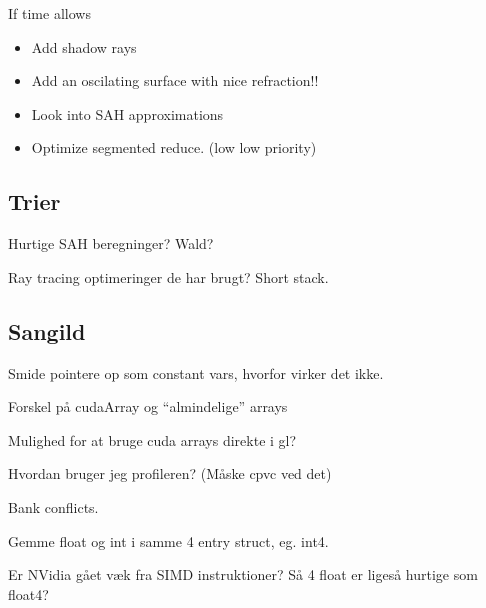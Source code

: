 If time allows

\begin{itemize}
\item Add shadow rays
\item Add an oscilating surface with nice refraction!!
\item Look into SAH approximations
\item Optimize segmented reduce. (low low priority)
\end{itemize}



\subsection*{Trier}

Hurtige SAH beregninger? Wald?

Ray tracing optimeringer de har brugt? Short stack.


\subsection*{Sangild}

Smide pointere op som constant vars, hvorfor virker det ikke.

Forskel på cudaArray og ``almindelige'' arrays

Mulighed for at bruge cuda arrays direkte i gl?

Hvordan bruger jeg profileren? (Måske cpvc ved det)

Bank conflicts.

Gemme float og int i samme 4 entry struct, eg. int4.

Er NVidia gået væk fra SIMD instruktioner? Så 4 float er ligeså
hurtige som float4?
